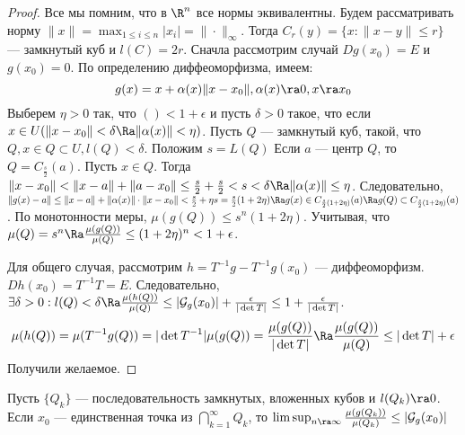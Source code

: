 \begin{proof}
    Все мы помним, что в \(\R^n\) все нормы эквивалентны. Будем рассматривать норму \(\|x\| = \max_{1 \le i \le n}|x_i| =\|\cdot\|_{\infty}\). Тогда \(C_r(y) = \{x: \|x - y\| \le r\}\) --- замкнутый куб и \(l(C) = 2r\). Сначла рассмотрим случай \(Dg(x_0) = E\) и \(g(x_0) = 0\). По определению диффеоморфизма, имеем:
    \[g(x) = x + \alpha(x) \|x - x_0\|, \alpha(x) \ra 0, x \ra x_0\]
    Выберем \(\eta > 0\) так, что \(() < 1 + \epsilon\) и пусть \(\delta > 0\) такое, что если \(x \in U (\|x - x_0\| < \delta \Ra \|\alpha(x)\| < \eta)\). Пусть \(Q\) --- замкнутый куб, такой, что \(Q, x \in Q \subset U, l(Q) < \delta\). Положим \(s = L(Q)\) Если \(a\) --- центр \(Q\), то \(Q = C_{\frac{s}{2}}(a)\). Пусть \(x \in Q\). Тогда \(\|x - x_0\| < \|x - a\| + \|a - x_0\| \le \frac{s}{2} + \frac{s}{2} < s < \delta \Ra \|\alpha(x)\| \le \eta\). Следовательно, \(\|g(x) - a\| \le \|x - a\| + \|\alpha(x)\|\cdot\|x-x_0\| < \frac{s}{2} + \eta s = \frac{s}{2}(1 + 2\eta) \Ra g(x) \in C_{\frac{s}{2}(1 + 2\eta)}(a) \Ra g(Q) \subset C_{\frac{s}{2}(1 + 2\eta)}(a)\). По монотонности меры, \(\mu(g(Q)) \le s^n(1 + 2\eta)\). Учитывая, что \(\mu(Q) = s^n \Ra \frac{\mu(g(Q))}{\mu(Q)} \le (1 + 2\eta)^n < 1 + \epsilon\).

    Для общего случая, рассмотрим \(h = T^{-1} g - T^{-1} g(x_0)\) --- диффеоморфизм. \(Dh(x_0) = T^{-1}T = E\). Следовательно, \(\exists \delta > 0: l(Q) < \delta \Ra \frac{\mu(h(Q))}{\mu(Q)} \le |\mathcal{G}_g(x_0)| + \frac{\epsilon}{|\det T|} \le 1 + \frac{\epsilon}{|\det T|}\).
    \[\mu(h(Q)) = \mu(T^{-1}g(Q)) = |\det T^{-1}|\mu(g(Q)) = \frac{\mu(g(Q))}{|\det T|} \Ra \frac{\mu(g(Q))}{\mu(Q)} \le |\det T| + \epsilon\]
    Получили желаемое.
\end{proof}

\begin{corollary}
    Пусть \(\{Q_k\}\) --- последовательность замкнутых, вложенных кубов и \(l(Q_k) \ra 0\). Если \(x_0\) --- единственная точка из \(\bigcap_{k = 1}^\infty Q_k\), то \(\limsup_{n \ra \infty} \frac{\mu(g(Q_k))}{\mu(Q_k)} \le |\mathcal{G}_g(x_0)|\)
\end{corollary}

